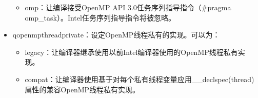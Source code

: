\documentclass[a4paper,12pt,english]{sphinxmanual}
\begin{document}
\begin{itemize}
\begin{itemize}
\item {} 
\sphinxAtStartPar
omp：让编译接受OpenMP API 3.0任务序列指导指令（\#pragma omp\_task）。Intel任务序列指导指令将被忽略。

\end{itemize}

\item {} 
\sphinxAtStartPar
\sphinxhyphen{}qopenmp\sphinxhyphen{}threadprivate：设定OpenMP线程私有的实现。可以为：
\begin{itemize}
\item {} 
\sphinxAtStartPar
legacy：让编译器继承使用以前Intel编译器使用的OpenMP线程私有实现。

\item {} 
\sphinxAtStartPar
compat：让编译器使用基于对每个私有线程变量应用\_\_declspec(thread)属性的兼容OpenMP线程私有实现。

\end{itemize}

\end{itemize}
\end{document}
